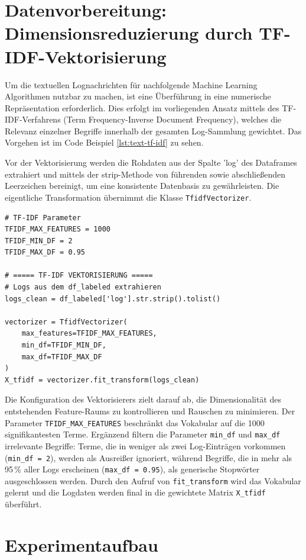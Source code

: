 \section{Datenvorbereitung: Dimensionsreduzierung durch TF-IDF-Vektorisierung}
Um die textuellen Lognachrichten für nachfolgende Machine Learning Algorithmen nutzbar zu machen, ist eine Überführung in eine numerische Repräsentation erforderlich. Dies erfolgt im vorliegenden Ansatz mittels des TF-IDF-Verfahrens (Term Frequency-Inverse Document Frequency), welches die Relevanz einzelner Begriffe innerhalb der gesamten Log-Sammlung gewichtet. Das Vorgehen ist im Code Beispiel \ref{lst:text-tf-idf} zu sehen. 

Vor der Vektorisierung werden die Rohdaten aus der Spalte 'log' des Dataframes extrahiert und mittels der strip-Methode von führenden sowie abschließenden Leerzeichen bereinigt, um eine konsistente Datenbasis zu gewährleisten. Die eigentliche Transformation übernimmt die Klasse \texttt{TfidfVectorizer}.

\begin{lstlisting}[caption={Vektorisieren mit TF-IDF}, label={lst:text-tf-idf}]
# TF-IDF Parameter
TFIDF_MAX_FEATURES = 1000
TFIDF_MIN_DF = 2
TFIDF_MAX_DF = 0.95

# ===== TF-IDF VEKTORISIERUNG =====
# Logs aus dem df_labeled extrahieren
logs_clean = df_labeled['log'].str.strip().tolist()

vectorizer = TfidfVectorizer(
    max_features=TFIDF_MAX_FEATURES,
    min_df=TFIDF_MIN_DF,
    max_df=TFIDF_MAX_DF
)
X_tfidf = vectorizer.fit_transform(logs_clean)
\end{lstlisting}

Die Konfiguration des Vektorisierers zielt darauf ab, die Dimensionalität des entstehenden Feature-Raums zu kontrollieren und Rauschen zu minimieren. Der Parameter \texttt{TFIDF\_MAX\_FEATURES} beschränkt das Vokabular auf die 1000 signifikantesten Terme. Ergänzend filtern die Parameter \texttt{min\_df} und \texttt{max\_df} irrelevante Begriffe: Terme, die in weniger als zwei Log-Einträgen vorkommen (\texttt{min\_df = 2}), werden als Ausreißer ignoriert, während Begriffe, die in mehr als 95\,\% aller Logs erscheinen (\texttt{max\_df = 0.95}), als generische Stopwörter ausgeschlossen werden. Durch den Aufruf von \texttt{fit\_transform} wird das Vokabular gelernt und die Logdaten werden final in die gewichtete Matrix \texttt{X\_tfidf} überführt.

\section{Experimentaufbau}
\label{sec:eval:aufbau}

